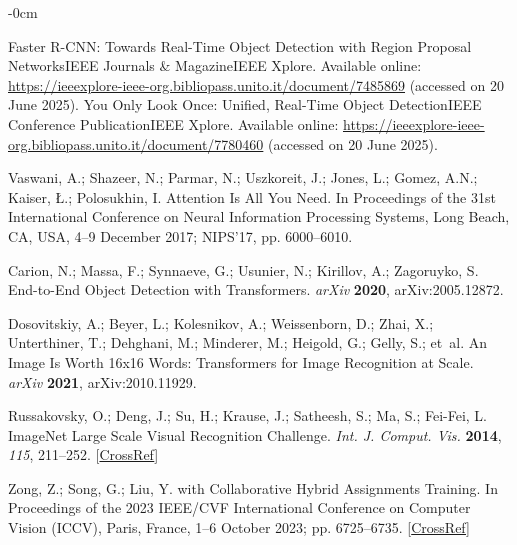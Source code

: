 \documentclass[12pt,a4paper,oneside]{report}
\newlength{\extralength}
\begin{document}
\begin{adjustwidth}{-\extralength}{0cm}
\begin{thebibliography}{999}
Faster {{R-CNN}}: {{Towards Real-Time Object Detection}} with {{Region Proposal
Networks}}{\textbar}{{IEEE Journals}} \& {{Magazine}}{\textbar}{{IEEE
Xplore}}.
\newblock Available online: \url{https://ieeexplore-ieee-org.bibliopass.unito.it/document/7485869} (accessed on 20 June 2025).
\newpage
{}
You {{Only Look Once}}: {{Unified}}, {{Real-Time Object Detection}}{\textbar}{{IEEE Conference Publication}}{\textbar}{{IEEE Xplore}}.
\newblock Available online: \url{https://ieeexplore-ieee-org.bibliopass.unito.it/document/7780460} (accessed on 20 June 2025).

Vaswani, A.; Shazeer, N.; Parmar, N.; Uszkoreit, J.; Jones, L.; Gomez, A.N.;
Kaiser, {\L}.; Polosukhin, I.
\newblock Attention Is All You Need.
\newblock In Proceedings of the 31st International Conference on Neural Information Processing Systems, Long Beach, CA, USA, 4--9 December 2017; {{NIPS}}'17, pp. 6000--6010.

Carion, N.; Massa, F.; Synnaeve, G.; Usunier, N.; Kirillov, A.; Zagoruyko, S.
\newblock End-to-{{End Object Detection}} with {{Transformers}}. {\em arXiv} {\bf 2020}, arXiv:2005.12872.

Dosovitskiy, A.; Beyer, L.; Kolesnikov, A.; Weissenborn, D.; Zhai, X.;
Unterthiner, T.; Dehghani, M.; Minderer, M.; Heigold, G.; Gelly, S.;  et~al.
\newblock An {{Image}} Is {{Worth}} 16x16 {{Words}}: {{Transformers}} for
{{Image Recognition}} at {{Scale}}. {\em arXiv} {\bf 2021}, arXiv:2010.11929.

Russakovsky, O.; Deng, J.; Su, H.; Krause, J.; Satheesh, S.; Ma, S.; Fei-Fei, L. ImageNet Large Scale Visual Recognition Challenge. {\em Int. J. Comput. Vis.} {\bf 2014}, {\em 115}, 211–252.
 [\href{http://dx.doi.org/10.1007/s11263-015-0816-y}{CrossRef}]

Zong, Z.; Song, G.; Liu, Y.
 with {{Collaborative Hybrid Assignments Training}}.
\newblock In Proceedings of the 2023 {{IEEE}}/{{CVF International Conference}}
on {{Computer Vision}} ({{ICCV}}), Paris, France, 1--6 October 2023; pp. 6725--6735. [\href{http://dx.doi.org/10.1109/ICCV51070.2023.00621}{CrossRef}]


\end{thebibliography}
\end{adjustwidth}
\end{document}
